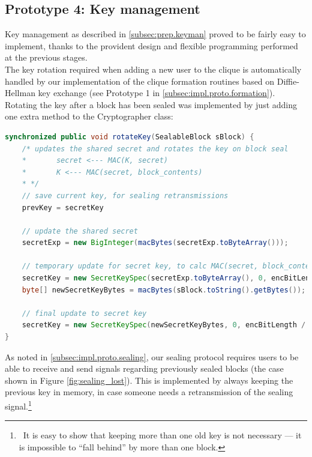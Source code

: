 \documentclass[a4paper, twoside, 12pt]{report}
\begin{document}
\subsection{Prototype 4: Key management}
Key management as described in \cref{subsec:prep.keyman} proved to be fairly easy to implement, thanks to the provident design and flexible programming performed at the previous stages. \\

The key rotation required when adding a new user to the clique is automatically handled by our implementation of the clique formation routines based on Diffie-Hellman key exchange (see Prototype 1 in \cref{subsec:impl.proto.formation}). \\

Rotating the key after a block has been sealed was implemented by just adding one extra method to the Cryptographer class:

\begin{lstlisting}[language=Java, columns=fullflexible, basicstyle=\scriptsize\ttfamily]
synchronized public void rotateKey(SealableBlock sBlock) {
    /* updates the shared secret and rotates the key on block seal
    *       secret <--- MAC(K, secret)
    *       K <--- MAC(secret, block_contents)
    * */ 
    // save current key, for sealing retransmissions
    prevKey = secretKey
    
    // update the shared secret
    secretExp = new BigInteger(macBytes(secretExp.toByteArray()));

    // temporary update for secret key, to calc MAC(secret, block_content)
    secretKey = new SecretKeySpec(secretExp.toByteArray(), 0, encBitLength / 8, encAlgo);
    byte[] newSecretKeyBytes = macBytes(sBlock.toString().getBytes());

    // final update to secret key
    secretKey = new SecretKeySpec(newSecretKeyBytes, 0, encBitLength / 8, encAlgo);
}
\end{lstlisting}
As noted in \cref{subsec:impl.proto.sealing}, our sealing protocol requires users to be able to receive and send signals regarding previously sealed blocks (the case shown in Figure \ref{fig:sealing_lost}). This is implemented by always keeping the previous key in memory, in case someone needs a retransmission of the sealing signal.\footnote{~It is easy to show that keeping more than one old key is not necessary --- it is impossible to ``fall behind'' by more than one block.}
\end{document}
